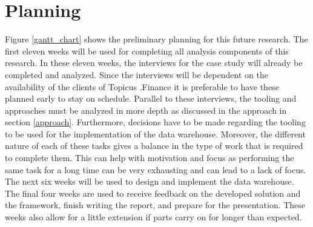\documentclass[11pt]{article}
\begin{document}
\section{Planning}
\label{planning}
Figure \ref{gantt_chart} shows the preliminary planning for this future research. The first eleven weeks will be used for completing all analysis components of this research. In these eleven weeks, the interviews for the case study will already be completed and analyzed. Since the interviews will be dependent on the availability of the clients of Topicus .Finance it is preferable to have these planned early to stay on schedule. Parallel to these interviews, the tooling and approaches must be analyzed in more depth as discussed in the approach in section \ref{approach}. Furthermore, decisions have to be made regarding the tooling to be used for the implementation of the data warehouse. Moreover, the different nature of each of these tasks gives a balance in the type of work that is required to complete them. This can help with motivation and focus as performing the same task for a long time can be very exhausting and can lead to a lack of focus. The next six weeks will be used to design and implement the data warehouse. The final four weeks are used to receive feedback on the developed solution and the framework, finish writing the report, and prepare for the presentation. These weeks also allow for a little extension if parts carry on for longer than expected.

\printbibliography
\onecolumn
\appendix
\end{document}

